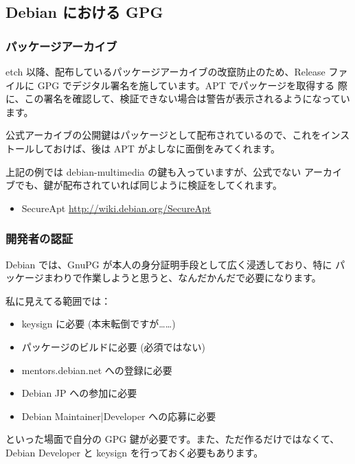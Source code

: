 \documentclass[mingoth,a4paper]{jsarticle}
\begin{document}
\subsection{Debian における GPG}


\subsubsection{パッケージアーカイブ}

etch 以降、配布しているパッケージアーカイブの改竄防止のため、Release
ファイルに GPG でデジタル署名を施しています。APT でパッケージを取得する
際に、この署名を確認して、検証できない場合は警告が表示されるようになっています。

公式アーカイブの公開鍵はパッケージとして配布されているので、これをインス
トールしておけば、後は APT がよしなに面倒をみてくれます。


上記の例では debian-multimedia の鍵も入っていますが、公式でない
アーカイブでも、鍵が配布されていれば同じように検証をしてくれます。

\begin{itemize}
 \item SecureApt \url{http://wiki.debian.org/SecureApt}
\end{itemize}

\subsubsection{開発者の認証}

Debian では、GnuPG が本人の身分証明手段として広く浸透しており、特に
パッケージまわりで作業しようと思うと、なんだかんだで必要になります。

私に見えてる範囲では：
\begin{itemize}
 \item keysign に必要 (本末転倒ですが……)
 \item パッケージのビルドに必要 (必須ではない)
 \item mentors.debian.net への登録に必要
 \item Debian JP への参加に必要
 \item Debian {Maintainer|Developer} への応募に必要
\end{itemize}
といった場面で自分の GPG 鍵が必要です。また、ただ作るだけではなくて、
Debian Developer と keysign を行っておく必要もあります。
\end{document}

